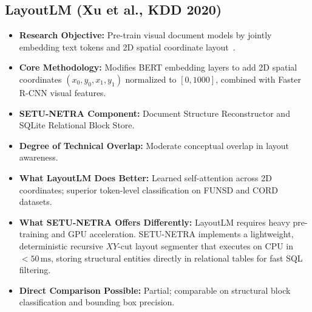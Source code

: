 \documentclass[11pt,a4paper]{article}
\begin{document}
\subsection{LayoutLM (Xu et al., KDD 2020)}
\begin{itemize}[leftmargin=*]
    \item \textbf{Research Objective:} Pre-train visual document models by jointly embedding text tokens and 2D spatial coordinate layout~\cite{Xu2020LayoutLM}.
    \item \textbf{Core Methodology:} Modifies BERT embedding layers to add 2D spatial coordinates $(x_0, y_0, x_1, y_1)$ normalized to $[0, 1000]$, combined with Faster R-CNN visual features.
    \item \textbf{SETU-NETRA Component:} Document Structure Reconstructor and SQLite Relational Block Store.
    \item \textbf{Degree of Technical Overlap:} Moderate conceptual overlap in layout awareness.
    \item \textbf{What LayoutLM Does Better:} Learned self-attention across 2D coordinates; superior token-level classification on FUNSD and CORD datasets.
    \item \textbf{What SETU-NETRA Offers Differently:} LayoutLM requires heavy pre-training and GPU acceleration. SETU-NETRA implements a lightweight, deterministic recursive $XY$-cut layout segmenter that executes on CPU in $< 50\,\text{ms}$, storing structural entities directly in relational tables for fast SQL filtering.
    \item \textbf{Direct Comparison Possible:} Partial; comparable on structural block classification and bounding box precision.
\end{itemize}

\end{document}
